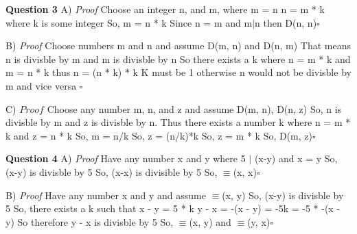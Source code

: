 \documentclass{article}
\begin{document}
\textbf{Question 3}\newline
A) \textit{Proof}\newline
Choose an integer n, and m, where m = n\newline
n = m * k where k is some integer\newline
So, m = n * k\newline
Since n = m and m$\mid$n then D(n, n)$\square$\newline

B) \textit{Proof}\newline
Choose numbers m and n and assume D(m, n) and D(n, m)\newline
That means n is divisble by m and m is divisble by n\newline
So there exists a k where n = m * k and m = n * k\newline
thus n = (n * k) * k\newline
K must be 1 otherwise n would not be divisble by m and vice versa $\square$\newline

C) $\textit{Proof}$\newline
Choose  any number m, n, and z and assume D(m, n), D(n, z)\newline
So, n is divisble by m and z is divisble by n.\newline
Thus there exists a number k where n = m * k and z = n * k\newline
So, m = n/k\newline
So, z = (n/k)*k\newline
So, z = m * k\newline
So, D(m, z)$\square$\newline\newline

\textbf{Question 4}\newline
A) \textit{Proof}\newline
Have any number x and y where 5 $\mid$ (x-y) and x = y\newline
So, (x-y) is divisble by 5\newline
So, (x-x) is divisible by 5\newline
So, $\equiv$(x, x)$\square$\newline

B) \textit{Proof}\newline
Have any number x and y and assume $\equiv$(x, y)\newline
So, (x-y) is divisble by 5\newline
So, there exists a k such that x - y = 5 * k\newline
y - x = -(x - y) = -5k = -5 * -(x - y)\newline
So therefore y - x is divisble by 5\newline
So, $\equiv$(x, y) and $\equiv$(y, x)$\square$\newline
\end{document}
